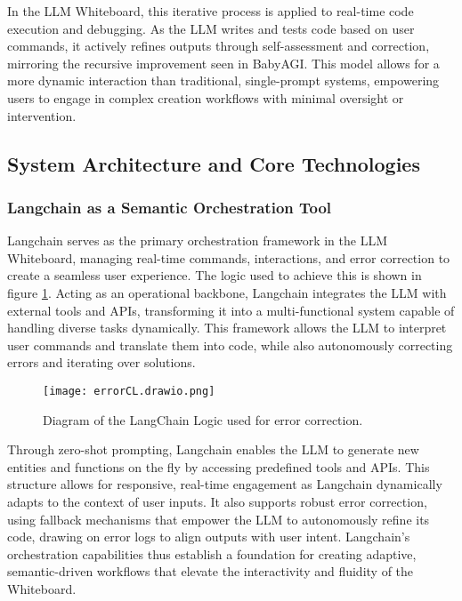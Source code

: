 In the LLM Whiteboard, this iterative process is applied to real-time code execution and debugging.
As the LLM writes and tests code based on user commands, it actively refines outputs through self-assessment and correction, mirroring the recursive improvement seen in BabyAGI.
This model allows for a more dynamic interaction than traditional, single-prompt systems, empowering users to engage in complex creation workflows with minimal oversight or intervention.

\subsection{System Architecture and Core Technologies}

\subsubsection{ Langchain as a Semantic Orchestration Tool }
Langchain\cite{chase2022} serves as the primary orchestration framework in the LLM Whiteboard, managing real-time commands, interactions, and error correction to create a seamless user experience.
The logic used to achieve this is shown in figure \ref{fig:langchainlogic}.
Acting as an operational backbone, Langchain integrates the LLM with external tools and APIs, transforming it into a multi-functional system capable of handling diverse tasks dynamically.
This framework allows the LLM to interpret user commands and translate them into code, while also autonomously correcting errors and iterating over solutions.

\begin{figure}[h!]
    \centering
    \texttt{[image: errorCL.drawio.png]}
    \caption{Diagram of the LangChain Logic used for error correction.}
    \vspace{0.1cm}
    \label{fig:langchainlogic}
\end{figure}

Through zero-shot prompting, Langchain enables the LLM to generate new entities and functions on the fly by accessing predefined tools and APIs.
This structure allows for responsive, real-time engagement as Langchain dynamically adapts to the context of user inputs.
It also supports robust error correction, using fallback mechanisms that empower the LLM to autonomously refine its code, drawing on error logs to align outputs with user intent.
Langchain’s orchestration capabilities thus establish a foundation for creating adaptive, semantic-driven workflows that elevate the interactivity and fluidity of the Whiteboard.

